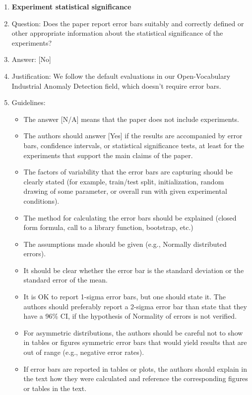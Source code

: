 \documentclass{llmxive}
\providecommand{\answerYes}[1][]{[Yes]#1}
\providecommand{\answerNo}[1][]{[No]#1}
\providecommand{\answerNA}[1][]{[N/A]#1}
\begin{document}
{\begin{enumerate}
\item {\bf Experiment statistical significance}
    \item[] Question: Does the paper report error bars suitably and correctly defined or other appropriate information about the statistical significance of the experiments?
    \item[] Answer: \answerNo{} %
    \item[] Justification: We follow the default evaluations in our Open-Vocabulary Industrial Anomaly Detection field, which doesn’t require error bars.
    \item[] Guidelines:
    \begin{itemize}
        \item The answer \answerNA{} means that the paper does not include experiments.
        \item The authors should answer \answerYes{} if the results are accompanied by error bars, confidence intervals, or statistical significance tests, at least for the experiments that support the main claims of the paper.
        \item The factors of variability that the error bars are capturing should be clearly stated (for example, train/test split, initialization, random drawing of some parameter, or overall run with given experimental conditions).
        \item The method for calculating the error bars should be explained (closed form formula, call to a library function, bootstrap, etc.)
        \item The assumptions made should be given (e.g., Normally distributed errors).
        \item It should be clear whether the error bar is the standard deviation or the standard error of the mean.
        \item It is OK to report 1-sigma error bars, but one should state it. The authors should preferably report a 2-sigma error bar than state that they have a 96\% CI, if the hypothesis of Normality of errors is not verified.
        \item For asymmetric distributions, the authors should be careful not to show in tables or figures symmetric error bars that would yield results that are out of range (e.g., negative error rates).
        \item If error bars are reported in tables or plots, the authors should explain in the text how they were calculated and reference the corresponding figures or tables in the text.
    \end{itemize}


\end{enumerate}}
\end{document}
